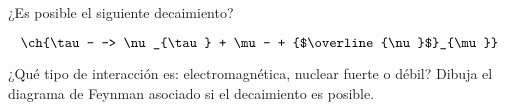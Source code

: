 \documentclass[./../main.tex]{subfiles}
\begin{document}
    \begin{exercise}
        ¿Es posible el siguiente decaimiento?

        \begin{equation*}
            \ch{\tau- -> \nu_{\tau} + \mu- + {$\overline{\nu}$}_{\mu}}
        \end{equation*}

        ¿Qué tipo de interacción es: electromagnética, nuclear fuerte o débil? Dibuja el diagrama de Feynman asociado si el decaimiento es posible.
    \end{exercise}
\end{document}
